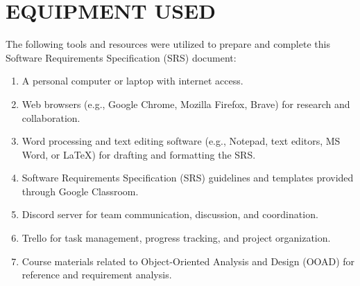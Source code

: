 \chapter{EQUIPMENT USED}
\label{ch:eqp_used}

The following tools and resources were utilized to prepare and complete this Software Requirements Specification (SRS) document:

\begin{enumerate}
    \item A personal computer or laptop with internet access.
    \item Web browsers (e.g., Google Chrome, Mozilla Firefox, Brave) for research and collaboration.
    \item Word processing and text editing software (e.g., Notepad, text editors, MS Word, or \LaTeX) for drafting and formatting the SRS.
    \item Software Requirements Specification (SRS) guidelines and templates provided through Google Classroom.
    \item Discord server for team communication, discussion, and coordination.
    \item Trello for task management, progress tracking, and project organization.
    \item Course materials related to Object-Oriented Analysis and Design (OOAD) for reference and requirement analysis.
\end{enumerate}

\clearpage

